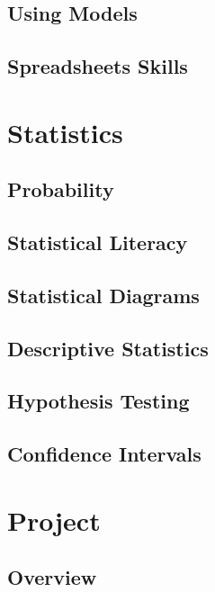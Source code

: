 \documentclass[
  11pt,
  openany]{book}
\begin{document}
\chapter{Using Models}\label{using-models}

\chapter{Spreadsheets Skills}\label{spreadsheets-skills}

\part{Statistics}\label{part-statistics}

\chapter{Probability}\label{probability}

\chapter{Statistical Literacy}\label{statistical-literacy}

\chapter{Statistical Diagrams}\label{statistical-diagrams}

\chapter{Descriptive Statistics}\label{descriptive-statistics}

\chapter{Hypothesis Testing}\label{hypothesis-testing}

\chapter{Confidence Intervals}\label{confidence-intervals}

\part{Project}\label{part-project}

\chapter*{Overview}\label{overview}
\end{document}
